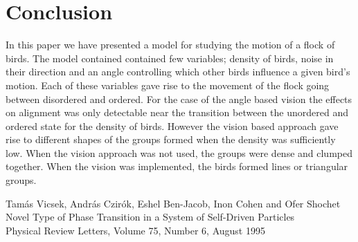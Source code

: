 \documentclass[twoside,twocolumn]{article}
\begin{document}
\section{Conclusion}


In this paper we have presented a model for studying the motion of a flock of birds.
The model contained contained few variables; density of birds, noise in their direction and an angle
controlling which other birds influence a given bird's motion. Each of these variables gave rise
to the movement of the flock going between disordered and ordered. For the case of the angle based
vision the effects on alignment was only detectable near the transition between the unordered
and ordered state for the density of birds.
However the vision based approach gave rise to different shapes of the groups formed when the density
was sufficiently low. When the vision approach was not used, the groups were dense and clumped
together. When the vision was implemented, the birds formed lines or triangular groups.




\begin{thebibliography}{99} %

  Tamás Vicsek, András Czirók, Eshel Ben-Jacob, Inon Cohen and Ofer Shochet\\
  Novel Type of Phase Transition in a System of Self-Driven Particles\\
  Physical Review Letters, Volume 75, Number 6, August 1995
 
\end{thebibliography}

\end{document}

